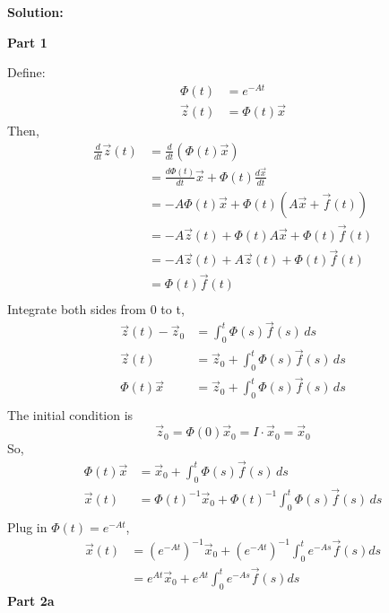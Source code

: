 \documentclass[12pt]{article}
\newenvironment{solution}{
    \textbf{Solution:}
    
}{
    
    \vspace{2em}
}
\begin{document}
\begin{solution}
    \textbf{Part 1}
    
    Define:
    \[
        \begin{aligned}
            \Phi(t) &= e^{-At}\\
            \vec{z}(t) &= \Phi(t)\vec{x}
        \end{aligned}
    \]
    Then,    
    \[
        \begin{aligned}
            \frac{d}{dt}\vec{z}(t) &= \frac{d}{dt}\left(\Phi(t)\vec{x}\right) \\
            &= \frac{d\Phi(t)}{dt}\vec{x} + \Phi(t)\frac{d\vec{x}}{dt} \\
            &= -A\Phi(t)\vec{x} + \Phi(t)(A\vec{x} + \vec{f}(t)) \\
            &= -A\vec{z}(t) + \Phi(t)A\vec{x} + \Phi(t)\vec{f}(t) \\
            &= -A\vec{z}(t) + A\vec{z}(t) + \Phi(t)\vec{f}(t) \\
            &= \Phi(t)\vec{f}(t)\\
        \end{aligned}
    \]
    Integrate both sides from 0 to t,
    \[
        \begin{aligned}
            \vec{z}(t) - \vec{z}_0 &= \int_0^t \Phi(s)\vec{f}(s) \, ds \\
            \vec{z}(t) &= \vec{z}_0 + \int_0^t \Phi(s)\vec{f}(s) \, ds \\
            \Phi(t)\vec{x} &= \vec{z}_0 + \int_0^t \Phi(s)\vec{f}(s) \, ds \\
        \end{aligned}
    \]
    The initial condition is
    \[
        \vec{z}_0 = \Phi(0)\vec{x}_0 = I \cdot \vec{x}_0 = \vec{x}_0
    \]
    So,
    \[
        \begin{aligned}
            \Phi(t)\vec{x} &= \vec{x}_0 + \int_0^t \Phi(s)\vec{f}(s) \, ds \\
            \vec{x}(t) &= \Phi(t)^{-1}\vec{x}_0 + \Phi(t)^{-1} \int_0^t \Phi(s)\vec{f}(s) \, ds \\
        \end{aligned}
    \]
    Plug in \(\Phi(t) = e^{-At}\),
    \[
        \begin{aligned}
            \vec{x}(t) &= (e^{-At})^{-1} \vec{x}_0 + (e^{-At})^{-1} \int_0^t e^{-As} \vec{f}(s) ds \\
            &= e^{At}\vec{x}_0 + e^{At} \int_0^t e^{-As} \vec{f}(s) ds
        \end{aligned}
    \]
    \textbf{Part 2a}


\end{solution}
\end{document}

